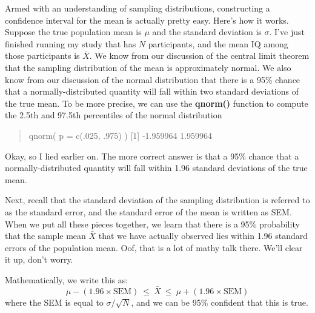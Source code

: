 \documentclass[
]{book}
\begin{document}
Armed with an understanding of sampling distributions, constructing a confidence interval for the mean is actually pretty easy. Here's how it works. Suppose the true population mean is \(\mu\) and the standard deviation is \(\sigma\). I've just finished running my study that has \(N\) participants, and the mean IQ among those participants is \(\bar{X}\). We know from our discussion of the central limit theorem that the sampling distribution of the mean is approximately normal. We also know from our discussion of the normal distribution that there is a 95\% chance that a normally-distributed quantity will fall within two standard deviations of the true mean. To be more precise, we can use the \textbf{qnorm()} function to compute the 2.5th and 97.5th percentiles of the normal distribution

\begin{quote}
qnorm( p = c(.025, .975) ) {[}1{]} -1.959964 1.959964
\end{quote}

Okay, so I lied earlier on. The more correct answer is that a 95\% chance that a normally-distributed quantity will fall within 1.96 standard deviations of the true mean.

Next, recall that the standard deviation of the sampling distribution is referred to as the standard error, and the standard error of the mean is written as SEM. When we put all these pieces together, we learn that there is a 95\% probability that the sample mean \(\bar{X}\) that we have actually observed lies within 1.96 standard errors of the population mean. Oof, that is a lot of mathy talk there. We'll clear it up, don't worry.

Mathematically, we write this as: \[\mu - \left( 1.96 \times \mbox{SEM} \right) \ \leq \  \bar{X}\  \leq \  \mu + \left( 1.96 \times \mbox{SEM} \right)\] where the SEM is equal to \(\sigma / \sqrt{N}\), and we can be 95\% confident that this is true.
\end{document}
